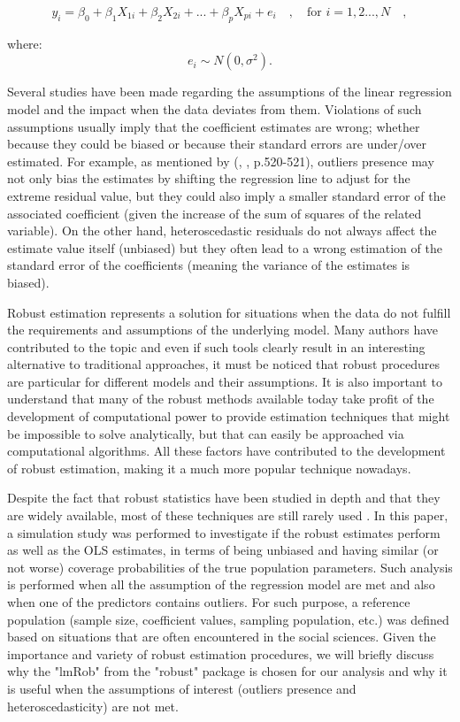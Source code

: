 \documentclass[a4paper]{article}
\begin{document}
\begin{equation*}
y_i=\beta_{0}+\beta_{1}X_{1i}+\beta_{2}X_{2i}+...+\beta_{p}X_{pi}+e_i \quad , \quad \text{for } i=1,2...,N \quad ,
\end{equation*}

\noindent
where:
\begin{equation*}
e_i\sim{}N(0,\sigma^{2}).
\end{equation*}

\vspace{3mm}
Several studies have been made regarding the assumptions of the linear regression model and the impact when the data deviates from them. Violations of such assumptions usually imply that the coefficient estimates are wrong; whether because they could be biased or because their standard errors are under/over estimated. For example, as mentioned by (\citeauthor{wilcox2016}, \citeyear{wilcox2016}, p.520-521), outliers presence may not only bias the estimates by shifting the regression line to adjust for the extreme residual value, but they could also imply a smaller standard error of the associated coefficient (given the increase of the sum of squares of the related variable). On the other hand, heteroscedastic residuals do not always affect the estimate value itself (unbiased) but they often lead to a wrong estimation of the standard error of the coefficients (meaning the variance of the estimates is biased).

Robust estimation represents a solution for situations when the data do not fulfill the requirements and assumptions of the underlying model. Many authors have contributed to the topic and even if such tools clearly result in an interesting alternative to traditional approaches, it must be noticed that robust procedures are particular for different models and their assumptions. It is also important to understand that many of the robust methods available today take profit of the development of computational power to provide estimation techniques that might be impossible to solve analytically, but that can easily be approached via computational algorithms. All these factors have contributed to the development of robust estimation, making it a much more popular technique nowadays. 

Despite the fact that robust statistics have been studied in depth and that they are widely available, most of these techniques are still rarely used \citep{wilcox2016}. In this paper, a simulation study was performed to investigate if the robust estimates perform as well as the OLS estimates, in terms of being unbiased and having similar (or not worse) coverage probabilities of the true population parameters. Such analysis is performed when all the assumption of the regression model are met and also when one of the predictors contains outliers. For such purpose, a reference population (sample size, coefficient values, sampling population, etc.) was defined based on situations that are often encountered in the social sciences. Given the importance and variety of robust estimation procedures, we will briefly discuss why the "lmRob" from the "robust" package \citep{robustpackage} is chosen for our analysis and why it is useful when the assumptions of interest (outliers presence and heteroscedasticity) are not met.
\end{document}
